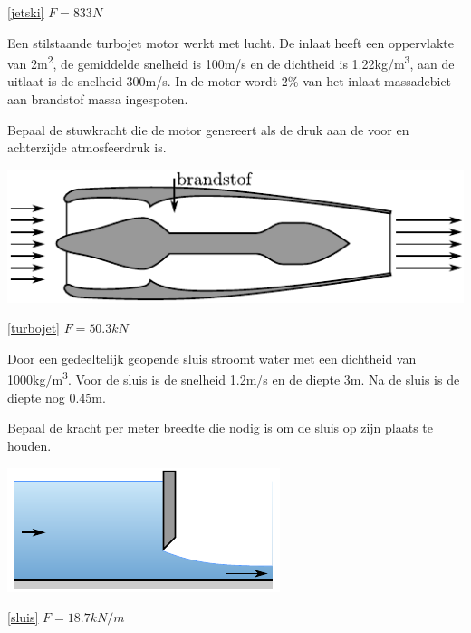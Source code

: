 \begin{antwoord}{\ref{jetski}}
	$F = 833\unit{N}$
\end{antwoord}
\begin{toepassing}
	\label{turbojet}
Een stilstaande turbojet motor werkt met lucht. De inlaat heeft een oppervlakte van 2\unit{m^2}, de gemiddelde snelheid is 100m/s en de dichtheid is 1.22\unit{kg/m^3}, aan de uitlaat is de snelheid 300m/s. In de motor wordt 2\% van het inlaat massadebiet aan brandstof massa ingespoten.

Bepaal de stuwkracht die de motor genereert als de druk aan de voor en achterzijde atmosfeerdruk is.

	\centering
	\includegraphics{fig/behoudsvergelijkingen/turbojet}
\end{toepassing}
\begin{antwoord}{\ref{turbojet}}
	$F = 50.3\unit{kN}$
\end{antwoord}
\begin{toepassing}
	\label{sluis}
Door een gedeeltelijk geopende sluis stroomt water met een dichtheid van 1000\unit{kg/m^3}. Voor de sluis is de snelheid 1.2m/s en de diepte 3m. Na de sluis is de diepte nog 0.45m.

Bepaal de kracht per meter breedte die nodig is om de sluis op zijn plaats te houden.

	\centering
	\includegraphics{fig/behoudsvergelijkingen/sluis}
\end{toepassing}
\begin{antwoord}{\ref{sluis}}
	$F = 18.7\unit{kN/m}$
\end{antwoord}
